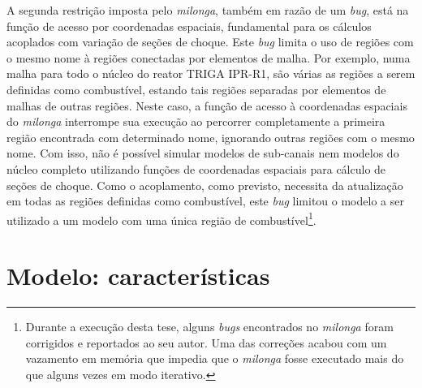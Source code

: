 A segunda restrição imposta pelo \textit{milonga}, também em razão de um \textit{bug}, está na função
de acesso por coordenadas espaciais, fundamental para os cálculos acoplados com variação de seções de choque.
Este \textit{bug} limita o uso de regiões com o mesmo nome à regiões conectadas por elementos de malha.
Por exemplo, numa malha para todo o núcleo do reator TRIGA IPR-R1, são várias as regiões a serem definidas
como combustível, estando
tais regiões separadas por elementos de malhas de outras regiões. Neste caso, a função de acesso
à coordenadas espaciais do \textit{milonga} interrompe sua execução ao percorrer completamente a primeira
região encontrada com determinado nome, ignorando outras regiões com o mesmo nome.
Com isso, não é possível simular modelos de sub-canais
nem modelos do núcleo completo utilizando funções de coordenadas espaciais para cálculo de seções de choque.
Como o acoplamento, como previsto, necessita da atualização em todas as regiões definidas como combustível,
este \textit{bug} limitou o modelo a ser utilizado a um modelo com uma única região de
combustível\footnote{Durante a execução desta tese, alguns \textit{bugs} encontrados
  no \textit{milonga} foram corrigidos e
  reportados ao seu autor. Uma das correções acabou com um vazamento em memória que impedia que o \textit{milonga}
  fosse executado mais do que alguns vezes em modo iterativo.}.






\section{Modelo: características}
%
%

